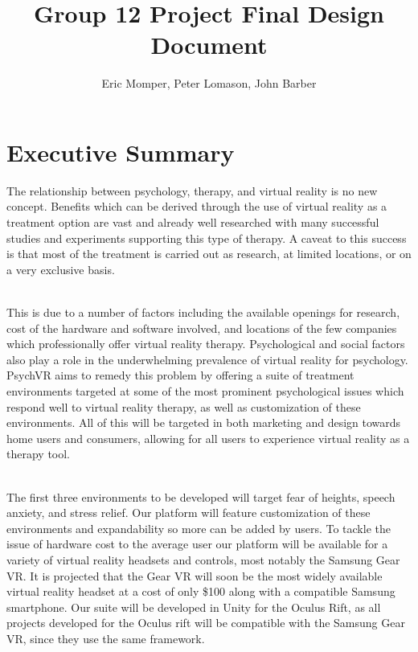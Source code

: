 \documentclass[a4paper,10pt]{article}
\title{Group 12 Project Final Design Document}
\author{Eric Momper, Peter Lomason, John Barber}
\begin{document}
	
\maketitle
	
	\pagebreak
	\tableofcontents
	\pagebreak
{}	
\section{Executive Summary}
The relationship between psychology, therapy, and virtual reality is no new concept. Benefits which can be derived through the use of virtual reality as a treatment option are vast 
and already well researched with many successful studies and experiments supporting this type of therapy. A caveat to this success is that most of the treatment is carried out as research, 
at limited locations, or on a very exclusive basis.
\par~\\ 
This is due to a number of factors including the available openings for research, cost of the hardware and software involved, and locations of the few companies which professionally offer virtual reality therapy. Psychological and social factors also play a role in the underwhelming prevalence of virtual reality for psychology.  PsychVR aims to remedy this problem by offering a suite of treatment environments targeted at some of the most prominent psychological issues which respond well to virtual reality therapy, as well as customization of these environments.  All of this will be targeted in both marketing and design towards home users and consumers, allowing for all users to experience virtual reality as a therapy tool.
\par ~\\
The first three environments to be developed will target fear of heights, speech anxiety, and stress relief. Our platform will feature customization of these environments and expandability so more can be added by users.  To tackle the issue of hardware cost to the average user our platform will be available for a variety of virtual reality headsets and controls, most notably the Samsung Gear VR. It is projected that the Gear VR will soon be the most widely available virtual reality headset at a cost of only \$100 along with a compatible Samsung smartphone. Our suite will be developed in Unity for the Oculus Rift, as all projects developed for the Oculus rift will be compatible with the Samsung Gear VR, since they use the same framework.
\par ~\\
\end{document}
